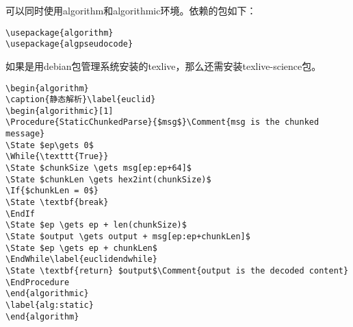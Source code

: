 可以同时使用algorithm和algorithmic环境。依赖的包如下：
\begin{verbatim}
\usepackage{algorithm}
\usepackage{algpseudocode}
\end{verbatim}

如果是用debian包管理系统安装的texlive，那么还需安装texlive-science包。
\begin{verbatim}
\begin{algorithm}
\caption{静态解析}\label{euclid}
\begin{algorithmic}[1]
\Procedure{StaticChunkedParse}{$msg$}\Comment{msg is the chunked message}
\State $ep\gets 0$
\While{\texttt{True}}
\State $chunkSize \gets msg[ep:ep+64]$
\State $chunkLen \gets hex2int(chunkSize)$
\If{$chunkLen = 0$}
\State \textbf{break}
\EndIf
\State $ep \gets ep + len(chunkSize)$
\State $output \gets output + msg[ep:ep+chunkLen]$
\State $ep \gets ep + chunkLen$
\EndWhile\label{euclidendwhile}
\State \textbf{return} $output$\Comment{output is the decoded content}
\EndProcedure
\end{algorithmic}
\label{alg:static}
\end{algorithm}
\end{verbatim}




















